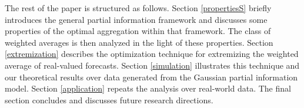 \documentclass[11pt]{article}
\theoremstyle{definition}
\theoremstyle{definition}
\begin{document}
  
  
 
  
  



The rest of the paper is structured as follows. Section \ref{propertiesS} briefly
introduces the general partial information framework and discusses some properties of
the optimal aggregation within that framework. The class of weighted
averages is then analyzed in the light of these
properties. Section \ref{extremization} describes the optimization technique for extremizing the weighted average of
real-valued forecasts. Section \ref{simulation} illustrates this
technique and our theoretical results over
data generated from the Gaussian partial information model. Section \ref{application} repeats the analysis over real-world data. The final section
concludes and discusses future research directions.
\end{document}
